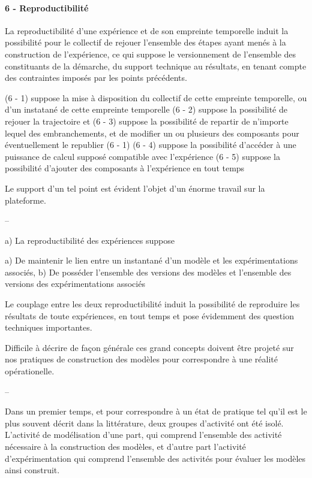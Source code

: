 \paragraph{6 - Reproductibilité}

La reproductibilité \autocite{Sandve2013} d'une expérience et de son empreinte temporelle induit la possibilité pour le collectif de rejouer l'ensemble des étapes ayant menés à la construction de l'expérience, ce qui suppose le versionnement de l'ensemble des constituants de la démarche, du support technique au résultats, en tenant compte des contraintes imposés par les points précédents.

(6 - 1) suppose la mise à disposition du collectif de cette empreinte temporelle, ou d'un instatané de cette empreinte temporelle
(6 - 2) suppose la possibilité de rejouer la trajectoire et 
(6 - 3) suppose la possibilité de repartir de n'importe lequel des embranchements, et de modifier un ou plusieurs des composants pour éventuellement le republier (6 - 1)
(6 - 4) suppose la possibilité d'accéder à une puissance de calcul supposé compatible avec l'expérience
(6 - 5) suppose la possibilité d'ajouter des composants à l'expérience en tout temps

Le support d'un tel point est évident l'objet d'un énorme travail sur la plateforme.


--

a) La reproductibilité des expériences suppose 

a) De maintenir le lien entre un instantané d'un modèle et les expérimentations associés, b) De posséder l'ensemble des versions des modèles et l'ensemble des versions des expérimentations associés

Le couplage entre les deux reproductibilité induit la possibilité de reproduire les résultats de toute expériences, en tout temps et pose évidemment des question techniques importantes.

Difficile à décrire de façon générale ces grand concepts doivent être projeté sur nos pratiques de construction des modèles pour correspondre à une réalité opérationelle.

--

Dans un premier temps, et pour correspondre à un état de pratique tel qu'il est le plus souvent décrit dans la littérature, deux groupes d'activité ont été isolé. L'activité de modélisation d'une part, qui comprend l'ensemble des activité nécessaire à la construction des modèles, et d'autre part l'activité d'expérimentation qui comprend l'ensemble des activités pour évaluer les modèles ainsi construit. 

